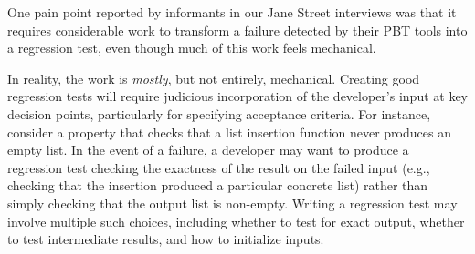 
%
One pain
point reported
by informants in our Jane Street interviews was that it requires
considerable work to
transform a failure detected by their PBT tools into a
regression test, even though much of this work
feels mechanical.

In reality, the work is \emph{mostly}, but not entirely, mechanical.
Creating good regression tests will require judicious incorporation of
the developer's input at key decision points, particularly for
specifying acceptance criteria. For instance, consider a property that checks
that a list insertion function never produces an empty list. In the event of a
failure, a developer may want to produce a regression test checking the
exactness of the result on the failed input (e.g., checking that the insertion
produced a particular concrete list) rather than simply checking that the output
list is non-empty. 
Writing a regression test may involve multiple such
choices, including whether to test for exact output, whether to test
intermediate results, and how to initialize inputs.

